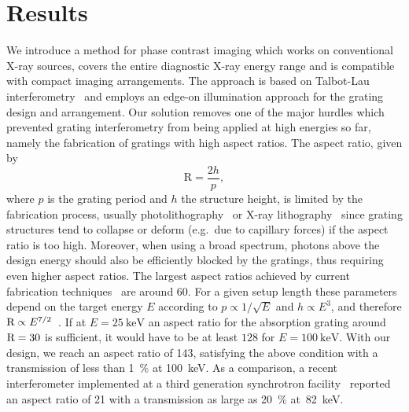 \documentclass[english]{nature}
\begin{document}
\section*{Results}
We introduce a method for phase contrast imaging which works on
conventional X-ray sources, covers the entire diagnostic X-ray energy range
and is compatible with compact imaging arrangements. The approach is based
on Talbot-Lau interferometry~\cite{Pfeiffer2006} and employs an edge-on
illumination approach for the grating design and arrangement. Our solution
removes one of the major hurdles which prevented grating interferometry from
being
applied at high energies so far, namely the fabrication of
gratings with high aspect ratios. The aspect ratio, given by
\begin{equation}
    \text{R} = \frac{2h}{p},
\end{equation}
where $p$ is the
grating period and $h$ the  structure height, is limited by the
fabrication process, usually photolithography~\cite{David2002} or X-ray
lithography~\cite{Mohr2012} since grating structures tend to collapse or deform
(e.g.\ due to capillary forces) if the aspect ratio is too high.
Moreover, when using a broad spectrum, photons above the design energy
should also be efficiently blocked by the gratings, thus requiring even
higher aspect ratios. The largest aspect ratios achieved by current
fabrication techniques~\cite{David2007,Kenntner2010} are around 60.
For a given setup length these parameters depend on the target energy $E$
according to $p \propto 1/\sqrt{E}$ and $h \propto E^3$, and therefore
$\textnormal{R} \propto E^{7/2}$~\cite{Momose2003a}. If at
$E=\SI{25}{\kilo\electronvolt}$ an aspect ratio for the absorption grating
around $\textnormal{R}=30$ is sufficient, it would have to be at least
$\num{128}$ for $E=\SI{100}{\kilo\electronvolt}$. With our design, we reach
an aspect ratio of \num{143}, satisfying the above condition with a
transmission of less than \SI{1}{\percent} at \SI{100}{\kilo\eV}. As a
comparison, a recent interferometer implemented at a third generation
synchrotron facility~\cite{Willner2013} reported an aspect ratio of
\num{21} with a transmission as large as \SI{20}{\percent}
at~\SI{82}{\kilo\eV}.
\end{document}
